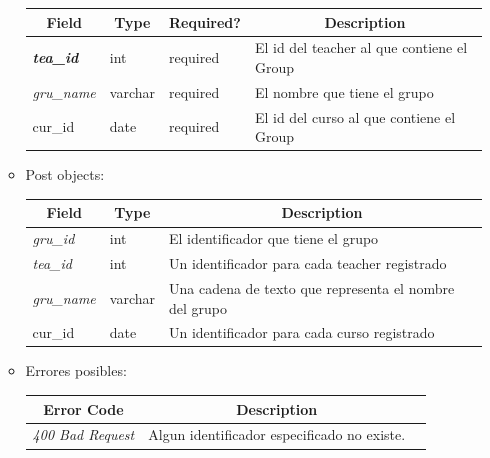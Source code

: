 \documentclass{article}
\begin{document}
\begin{enumerate}
\begin{itemize}
\begin{table}[H]
\begin{tabular}{|l|l|l|l|}
        \multicolumn{1}{|c|}{\textbf{Field}} &
        \multicolumn{1}{c|}{\textbf{Type}} &
        \multicolumn{1}{c|}{\textbf{Required?}} &
        \multicolumn{1}{c|}{\textbf{Description}} \\ \hline
        \textit{\textbf{tea\_id}} & int & required & El id del teacher al que
        contiene el Group \\ \hline \textit{gru\_name} & varchar & required & El
        nombre que tiene el grupo \\ \hline cur\_id & date & required & El id
        del curso al que contiene el Group \\ \hline \end{tabular} \end{table}
        \item Post objects:
        \begin{table}[H] \centering \begin{tabular}{|l|l|l|} \hline
        \multicolumn{1}{|c|}{\textbf{Field}} &
        \multicolumn{1}{c|}{\textbf{Type}} &
        \multicolumn{1}{c|}{\textbf{Description}} \\ \hline \textit{gru\_id} &
        int & El identificador que tiene el grupo \\ \hline \textit{tea\_id} &
        int & Un identificador para cada teacher registrado \\ \hline
        \textit{gru\_name} & varchar & Una cadena de texto que representa el
        nombre del grupo \\ \hline cur\_id & date & Un identificador para cada
        curso registrado \\ \hline \end{tabular} \end{table}
        \item Errores posibles: \begin{table}[H] \centering
        \begin{tabular}{|c|c|l|} \hline \textbf{Error Code} &
        \textbf{Description} \\ \hline \textit{400 Bad Request} & Algun
        identificador especificado no existe. \\ \hline \end{tabular}
        \end{table}
    \end{itemize}


\end{enumerate}
\end{document}

